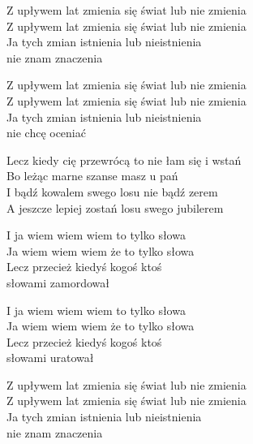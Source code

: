 \begin{text}
    Z upływem lat zmienia się świat lub nie zmienia\\
    Z upływem lat zmienia się świat lub nie zmienia\\
    Ja tych zmian istnienia lub nieistnienia\\
    nie znam znaczenia

    Z upływem lat zmienia się świat lub nie zmienia\\
    Z upływem lat zmienia się świat lub nie zmienia\\
    Ja tych zmian istnienia lub nieistnienia\\
    nie chcę oceniać

    Lecz kiedy cię przewrócą to nie łam się i wstań\\
    Bo leżąc marne szanse masz u pań\\
    I bądź kowalem swego losu nie bądź zerem\\
    A jeszcze lepiej zostań losu swego jubilerem

    I ja wiem wiem wiem to tylko słowa\\
    Ja wiem wiem wiem że to tylko słowa\\
    Lecz przecież kiedyś kogoś ktoś\\
    słowami zamordował

    I ja wiem wiem wiem to tylko słowa\\
    Ja wiem wiem wiem że to tylko słowa\\
    Lecz przecież kiedyś kogoś ktoś\\
    słowami uratował

    Z upływem lat zmienia się świat lub nie zmienia\\
    Z upływem lat zmienia się świat lub nie zmienia\\
    Ja tych zmian istnienia lub nieistnienia\\
    nie znam znaczenia
\end{text}
\begin{chord}

\end{chord}